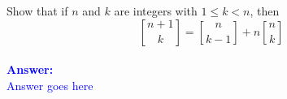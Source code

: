 \item{}
Show that if $n$ and $k$ are integers with $1\le k<n$, then
$${n+1\brack k}={n\brack k-1}+n{n\brack k}$$
\\[12pt]
\ifanswers
\textcolor{blue}{
\textbf{Answer:}\\[6pt]
Answer goes here
}
\newpage
\fi
